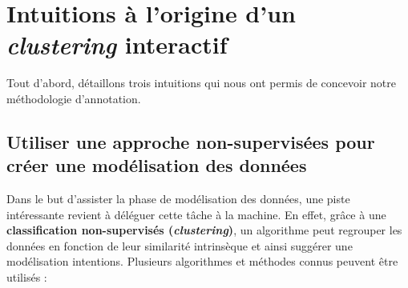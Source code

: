 \section{Intuitions à l'origine d'un \textit{clustering} interactif}
\label{section:3.1-INTUITIONS-ORIGINES}

	Tout d'abord, détaillons trois intuitions qui nous ont permis de concevoir notre méthodologie d'annotation.
	
	
	\subsection{Utiliser une approche non-supervisées pour créer une modélisation des données}
	\label{section:3.1.1-INTUITIONS-ORIGINES-NON-SUPERVISEES}
	
		Dans le but d'assister la phase de modélisation des données, une piste intéressante revient à déléguer cette tâche à la machine.
		En effet, grâce à une \textbf{classification non-supervisés (\textit{clustering})}, un algorithme peut regrouper les données en fonction de leur similarité intrinsèque et ainsi suggérer une modélisation intentions.
		Plusieurs algorithmes et méthodes connus peuvent être utilisés :
		
